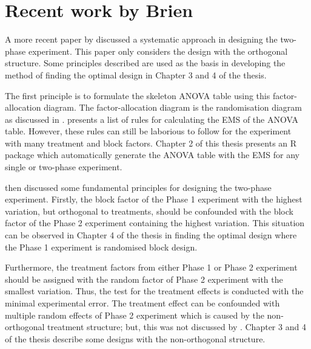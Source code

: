 \documentclass[11pt,a4paper]{article}
\begin{document}
 
\section{Recent work by Brien}
\label{sec:brien2011}
A more recent paper by \cite{Brien2011} discussed a systematic approach in designing the two-phase experiment. This paper only considers the design with the orthogonal structure. Some principles described are used as the basis in developing the method of finding the optimal design in Chapter 3 and 4 of the thesis. 

The first principle is to formulate the skeleton ANOVA table using this factor-allocation diagram. The factor-allocation diagram is the randomisation diagram as discussed in \cite{Brien2006b}. \cite{Brien2011} presents a list of rules for calculating the EMS of the ANOVA table. However, these rules can still be laborious to follow for the experiment with many treatment and block factors. Chapter 2 of this thesis presents an R package which automatically generate the ANOVA table with the EMS for any single or two-phase experiment. 

\cite{Brien2011} then discussed some fundamental principles for designing the two-phase experiment. Firstly, the block factor of the Phase 1 experiment with the highest variation, but orthogonal to treatments, should be confounded with the block factor of the Phase 2 experiment containing the highest variation. This situation can be observed in Chapter 4 of the thesis in finding the optimal design where the Phase 1 experiment is randomised block design. 

Furthermore, the treatment factors from either Phase 1 or Phase 2 experiment should be assigned with the random factor of Phase 2 experiment with the smallest variation. Thus, the test for the treatment effects is conducted with the minimal experimental error. The treatment effect can be confounded with multiple random effects of Phase 2 experiment which is caused by the non-orthogonal treatment structure; but, this was not discussed by \cite{Brien2011}. Chapter 3 and 4 of the thesis describe some designs with the non-orthogonal structure. 
\end{document}
